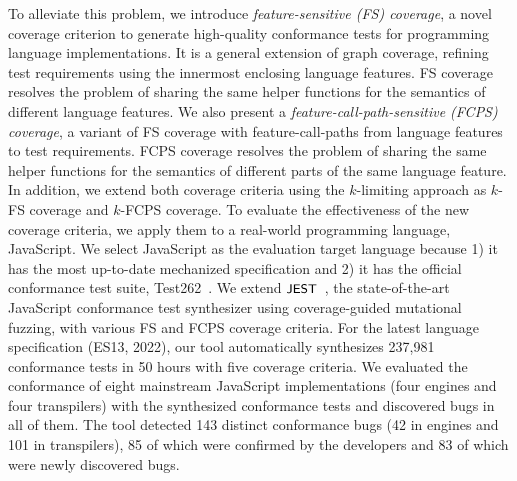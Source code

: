 To alleviate this problem, we introduce \textit{feature-sensitive (FS) coverage},
a novel coverage criterion to generate high-quality conformance tests for
programming language implementations. It is a general extension of graph coverage,
refining test requirements using the innermost enclosing language features.
FS coverage resolves the problem of sharing the same helper functions
for the semantics of different language features.
We also present a \textit{feature-call-path-sensitive (FCPS) coverage},
a variant of FS coverage with feature-call-paths from language features to test requirements.
FCPS coverage resolves the problem of sharing the same helper functions
for the semantics of different parts of the same language feature.
In addition, we extend both coverage criteria using the $k$-limiting approach as $k$-FS
coverage and $k$-FCPS coverage.
To evaluate the effectiveness of the new coverage criteria,
we apply them to a real-world programming language, JavaScript.
We select JavaScript as the evaluation target language because
1) it has the most up-to-date mechanized specification and
2) it has the official conformance test suite, Test262~\cite{test262}.
We extend $\textsf{\small JEST}$~\cite{jest}, the state-of-the-art JavaScript conformance test
synthesizer using coverage-guided mutational fuzzing, with various FS
and FCPS coverage criteria.
For the latest language specification (ES13, 2022), our tool automatically
synthesizes 237,981 conformance tests in 50 hours with five coverage criteria.
We evaluated the conformance of eight mainstream JavaScript implementations
(four engines and four transpilers) with the synthesized conformance tests
and discovered bugs in all of them.
The tool detected 143 distinct conformance bugs (42 in engines
and 101 in transpilers), 85 of which were confirmed by
the developers and 83 of which were newly discovered bugs.


